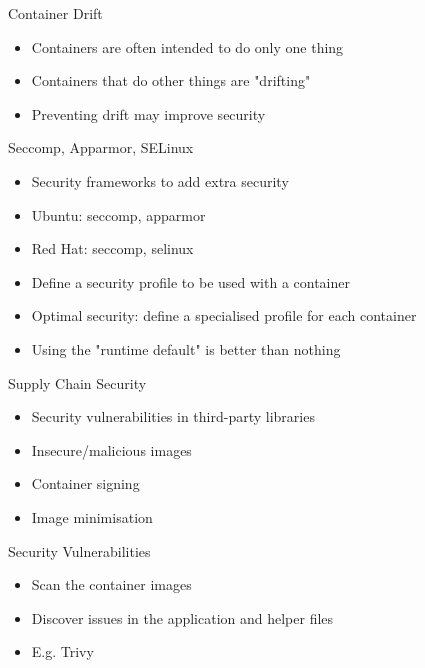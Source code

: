 \documentclass{dcpresentation}
\begin{document}

\begin{frame}{Container Drift}
 \begin{itemize}
  \item Containers are often intended to do only one thing
  \item Containers that do other things are "drifting"
  \item Preventing drift may improve security
 \end{itemize}
\end{frame}

\begin{frame}{Seccomp, Apparmor, SELinux}
  \begin{itemize}
  \item Security frameworks to add extra security
  \item Ubuntu: seccomp, apparmor
  \item Red Hat: seccomp, selinux
  \item Define a security profile to be used with a container
  \item Optimal security: define a specialised profile for each container
  \item Using the "runtime default" is better than nothing
  \end{itemize}
\end{frame}

\begin{frame}{Supply Chain Security}
  \begin{itemize}
  \item Security vulnerabilities in third-party libraries
  \item Insecure/malicious images
  \item Container signing
  \item Image minimisation
  \end{itemize}
\end{frame}

\begin{frame}{Security Vulnerabilities}
  \begin{itemize}
  \item Scan the container images
  \item Discover issues in the application and helper files
  \item E.g. Trivy
  \end{itemize}
\end{frame}
\end{document}
